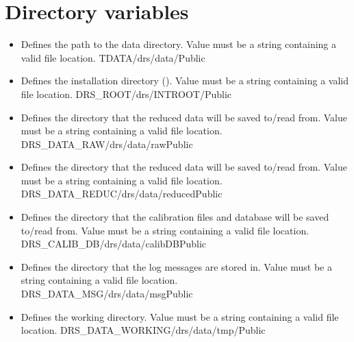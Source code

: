 \section{Directory variables}
\label{ch:variables:directory}

\begin{itemize}

\item \label{text:tdata} 
{Defines the path to the data directory. Value must be a string containing a valid file location.}
{TDATA}{/drs/data/}{\AllRecipes}{\configtxtfile}{\spirouConst}{Public}

\item \label{text:drs_root} 
{Defines the installation directory (\InstallDIR). Value must be a string containing a valid file location.}
{DRS\_ROOT}{/drs/INTROOT/}{\AllRecipes}{\configtxtfile}{\spirouConst}{Public}


\item \label{text:drs_data_raw} 
{Defines the directory that the reduced data will be saved to/read from. Value must be a string containing a valid file location.}
{DRS\_DATA\_RAW}{/drs/data/raw}{\AllRecipes}{\configtxtfile}{\spirouConst}{Public}


\item \label{text:drs_data_reduc} 
{Defines the directory that the reduced data will be saved to/read from. Value must be a string containing a valid file location.}
{DRS\_DATA\_REDUC}{/drs/data/reduced}{\AllRecipes}{\configtxtfile}{\spirouConst}{Public}


\item \label{text:drs_calib_db} 
{Defines the directory that the calibration files and database will be saved to/read from. Value must be a string containing a valid file location.}
{DRS\_CALIB\_DB}{/drs/data/calibDB}{\AllRecipes}{\configtxtfile}{\spirouConst}{Public}


\item \label{text:drs_data_msg} 
{Defines the directory that the log messages are stored in. Value must be a string containing a valid file location.}
{DRS\_DATA\_MSG}{/drs/data/msg}{\AllRecipes}{\configtxtfile}{\spirouConst}{Public}


\item \label{text:drs_data_working} 
{Defines the working directory. Value must be a string containing a valid file location.}
{DRS\_DATA\_WORKING}{/drs/data/tmp/}{\AllRecipes}{\configtxtfile}{\spirouConst}{Public}


\end{itemize}





